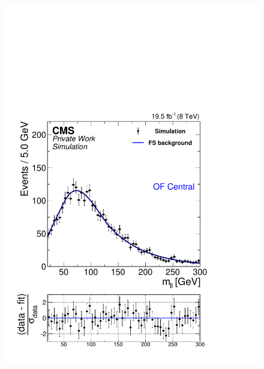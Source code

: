 \begin{figure}[hbp]
\begin{minipage}[t]{0.49\textwidth}
    \includegraphics[width=\textwidth]{plots/results/fit/mcFits/fit2012OFOS_ETHTriangle_SignalInclusive_Combined_Full2012_ETHTriangle_MC_Central.pdf}
  \end{minipage}
  \begin{minipage}[t]{0.49\textwidth}

\end{minipage}
\end{figure}
